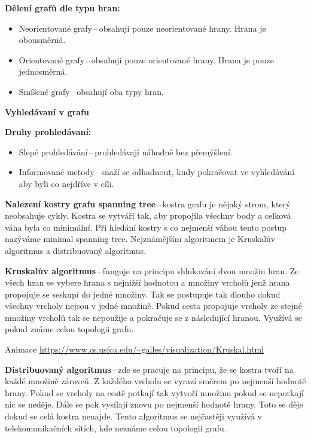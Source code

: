 \textbf{Dělení grafů dle typu hran:}
\begin{itemize}
    \item Neorientované grafy\,--\,obsahují pouze neorientované hrany. Hrana je obousměrná.
    \item Orientované grafy\,--\,obsahují pouze orientované hrany. Hrana je pouze jednosměrná.
    \item Smíšené grafy\,--\,obsahují oba typy hran.
\end{itemize}

\begin{Large}\vspace{0,5cm} \textbf{Vyhledávaní v grafu}
\end{Large}

\textbf{Druhy prohledávaní:}
\begin{itemize}
    \item Slepé prohledávání\,--\,prohledávají náhodně bez přemýšlení.
    \item Informované metody\,--\,snaží se odhadnout, kudy pokračovat ve vyhledávání aby byli co nejdříve v cíli.
\end{itemize}

\textbf{Nalezení kostry grafu spanning tree}\,--\,kostra grafu je nějaký strom, který neobsahuje cykly. Kostra se vytváří tak, aby propojila všechny body a celková váha byla co minimální. Při hledání kostry s co nejmenší váhou tento postup nazýváme minimal spanning tree. Nejznámějším algoritmem je Kruskalův algoritmus a distribuovaný algoritmus.

\textbf{Kruskalův algoritmus}\,--\,funguje na principu shlukování dvou množin hran. Ze všech hran se vybere hrana s nejnižší hodnotou a množiny vrcholů jenž hrana propojuje se seskupí do jedné množiny. Tak se postupuje tak dlouho dokud všechny vrcholy nejsou v jedné množině. Pokud cesta propojuje vrcholy ze stejné množiny vrcholů tak se nepoužije a pokračuje se z následující hranou. Využívá se pokud známe celou topologii grafu.

Animace \url{https://www.cs.usfca.edu/~galles/visualization/Kruskal.html}

\textbf{Distribuovaný algoritmus}\,--\,zde se pracuje na principu, že se kostra tvoří na každé množině zároveň. Z každého vrcholu se vyrazí směrem po nejmenší hodnotě hrany. Pokud se vrcholy na cestě potkají tak vytvoří množinu pokud se nepotkají nic se neděje. Dále se pak vysílají znovu po nejmenší hodnotě hrany. Toto se děje dokud se celá kostra nenajde. Tento algoritmus se nejčastěji využívá v telekomunikačních sítích, kde neznáme celou topologii grafu.

